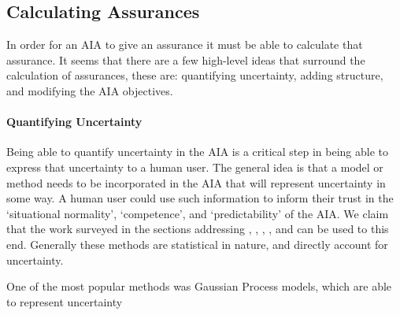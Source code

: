 \subsection{Calculating Assurances}

    In order for an AIA to give an assurance it must be able to calculate that assurance. It seems that there are a few high-level ideas that surround the calculation of assurances, these are: quantifying uncertainty, adding structure, and modifying the AIA objectives.

    \paragraph{Quantifying Uncertainty} Being able to quantify uncertainty in the AIA is a critical step in being able to express that uncertainty to a human user. The general idea is that a model or method needs to be incorporated in the AIA that will represent uncertainty in some way. A human user could use such information to inform their trust in the `situational normality', `competence', and `predictability' of the AIA. We claim that the work surveyed in the sections addressing , , , , and  can be used to this end. Generally these methods are statistical in nature, and directly account for uncertainty.

    One of the most popular methods was Gaussian Process models, which are able to represent uncertainty

